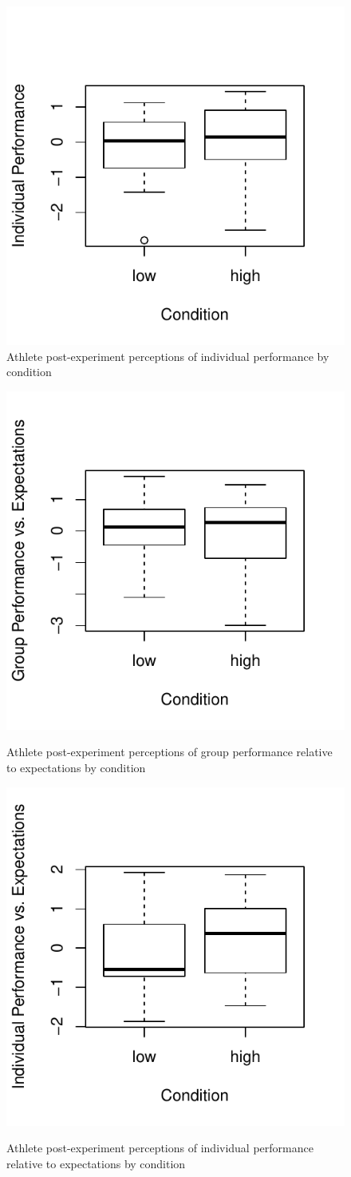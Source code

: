\begin{figure}
  \centering
  \includegraphics[width=0.5\linewidth,keepaspectratio] {images/indComponentPerformancePostBoxPlot-1}
  \caption{Athlete post-experiment perceptions of individual performance by condition}
    \label{fig:indComponentPerformancePostBoxPlot}
\end{figure}

\begin{figure}
  \centering
  \includegraphics[width=0.5\linewidth,keepaspectratio] {images/groupPerfExpPostBoxPlot-1}
          \label{fig:groupPerfExpPostBoxPlot}
        \caption{Athlete post-experiment perceptions of group performance relative to expectations by condition}
\end{figure}


\begin{figure}
  \centering
      \includegraphics[width=0.5\linewidth,keepaspectratio] {images/indPerfExpPostBoxPlot-1}
              \label{fig:indPerfExpPostBoxPlot}
              \caption{Athlete post-experiment perceptions of individual performance relative to expectations by condition}
\end{figure}


